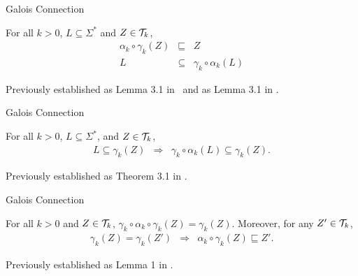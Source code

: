 \documentclass[pdf]{beamer}
\newcommand{\blue}[1]{\color{blue}{#1}\normalcolor }
\begin{document}
\begin{frame}{Galois Connection}

\begin{corollary} 
\label{flationary}
For all $k>0$, $L \subseteq \Sigma^{\ast}$ and $Z \in {\cal T}_k$,
\begin{eqnarray*}
\label{prop1}
\alpha_k \circ \gamma_k (Z) & \sqsubseteq & Z\\
\label{prop2}
L & \subseteq & \gamma_k \circ \alpha_k(L)
\end{eqnarray*}
\end{corollary}

Previously established as Lemma 3.1 in \blue{Garcia and Vidal (1990)}\  and as Lemma 3.1 in \blue{Yokomori and Kobayashi (1998)}.



\end{frame}




\begin{frame}{Galois Connection}


\begin{corollary}
\label{smallestlanguage}
For all $k>0$, $L \subseteq \Sigma^{\ast}$, and $Z \in {\cal T}_k$,
\begin{eqnarray*}
L \subseteq \gamma_k(Z) & \Rightarrow & \gamma_k \circ \alpha_k (L) \subseteq \gamma_k(Z).
\end{eqnarray*}
\end{corollary}

\vspace{0.5cm}

Previously established as Theorem 3.1 in \blue{Garcia and Vidal (1990)}.

\end{frame}







\begin{frame}{Galois Connection}

\begin{corollary}
For all $k>0$ and $Z \in {\cal T}_k$,
$\gamma_k \circ \alpha_k \circ \gamma_k (Z) = \gamma_k(Z)$. Moreover, for any $Z' \in {\cal T}_k$,
\begin{eqnarray*}
\gamma_k(Z) = \gamma_k(Z') & \Rightarrow & \alpha_k \circ \gamma_k (Z) \sqsubseteq Z'.
\end{eqnarray*}
\end{corollary}

\vspace{0.5cm}

Previously established as Lemma 1 in \blue{Yokomori and Kobayashi (1998)}.

\end{frame}
\end{document}
